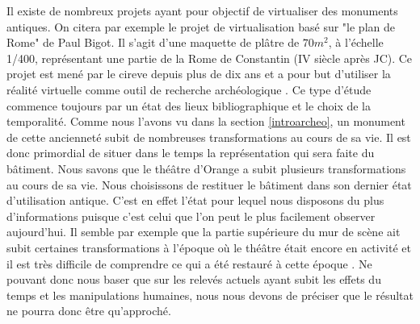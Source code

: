Il existe de nombreux projets ayant pour objectif de virtualiser des monuments antiques. On citera par exemple le projet de virtualisation basé sur "le plan de Rome" de Paul Bigot. Il s'agit d'une maquette de plâtre de $70m^2$, à l'échelle 1/400, représentant une partie de la Rome de Constantin (IV siècle après JC). Ce projet est mené par le \gls{cireve} depuis plus de dix ans et a pour but d'utiliser la réalité virtuelle comme outil de recherche archéologique \cite[p. 157-158]{fleury}. Ce type d'étude commence toujours par un état des lieux bibliographique et le choix de la temporalité. Comme nous l'avons vu dans la section \ref{introarcheo}, un monument de cette ancienneté subit de nombreuses transformations au cours de sa vie. Il est donc primordial de situer dans le temps la représentation qui sera faite du bâtiment. Nous savons que le théâtre d'Orange a subit plusieurs transformations au cours de sa vie. Nous choisissons de restituer le bâtiment dans son dernier état d'utilisation antique. C'est en effet l'état pour lequel nous disposons du plus d'informations puisque c'est celui que l'on peut le plus facilement observer aujourd'hui. Il semble par exemple que la partie supérieure du mur de scène ait subit certaines transformations à l'époque où le théâtre était encore en activité et il est très difficile de comprendre ce qui a été restauré à cette époque \cite[p.33]{orangeTxt}. Ne pouvant donc nous baser que sur les relevés actuels ayant subit les effets du temps et les manipulations humaines, nous nous devons de préciser que le résultat ne pourra donc être qu'approché.


